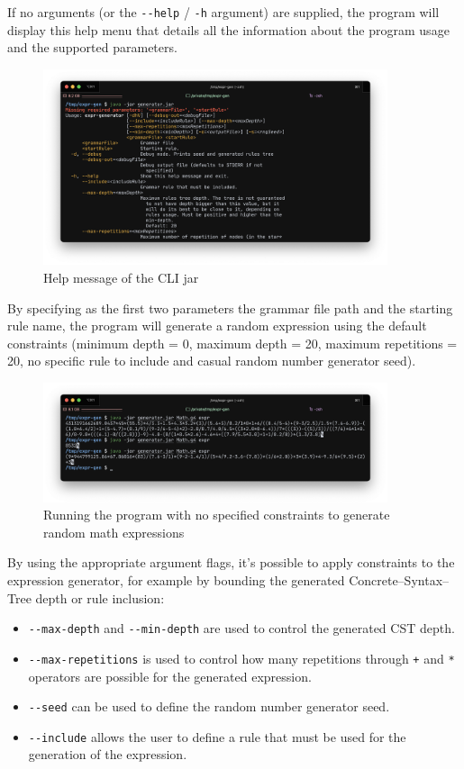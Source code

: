 \documentclass[]{usiinfbachelorproject}
\begin{document}
If no arguments (or the \texttt{-{}-help} / \texttt{-h} argument) are supplied,
the program will display this help menu that details all the information
about the program usage and the supported parameters.

\begin{figure}[ht]
\centering
\includegraphics[width=0.9\textwidth]{img/validation/cli_step0.png}
\caption{Help message of the CLI jar}
\end{figure}

By specifying as the first two parameters the grammar file path and the starting
rule name, the program will generate a random expression using the default
constraints (minimum depth = 0, maximum depth = 20, maximum repetitions = 20,
no specific rule to include and casual random number generator seed).

\begin{figure}[ht]
\centering
\includegraphics[width=0.9\textwidth]{img/validation/cli_step1.png}
\caption{Running the program with no specified constraints to generate random
math expressions
}\label{validation-cli-1}
\end{figure}

By using the appropriate argument flags, it's possible to apply constraints to
the expression generator, for example by bounding the generated
Concrete–Syntax–Tree depth or rule inclusion:

\begin{itemize}
\item \texttt{-{}-max-depth} and \texttt{-{}-min-depth} are used to control the
      generated CST depth.
\item \texttt{-{}-max-repetitions} is used to control how many repetitions
      through \texttt{+} and \texttt{*} operators are possible for the generated
      expression.
\item \texttt{-{}-seed} can be used to define the random number generator seed.
\item \texttt{-{}-include} allows the user to define a rule that must be used
      for the generation of the expression.
\end{itemize}
\end{document}
